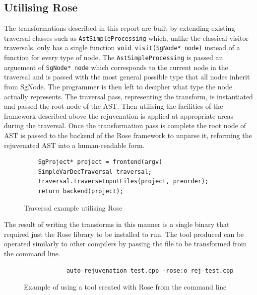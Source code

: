 \documentclass[bsc,frontabs,singlespacing,twoside,parskip,deptreport]{infthesis}
\begin{document}
\subsection{Utilising Rose} \label{UTIL_ROSE}

The transformations described in this report are built by extending existing traversal classes such as \texttt{AstSimpleProcessing} \cite{ROSE_MANUAL} which, unlike the classical visitor traversals, only has a single function \texttt{void visit(SgNode* node)} instead of a function for every type of node. The \texttt{AstSimpleProcessing} is passed an arguement of \texttt{SgNode* node} which corresponds to the current node in the traversal and is passed with the most general possible type that all nodes inherit from SgNode. The programmer is then left to decipher what type the node actually represents. The traversal pass, representing the transform, is instantiated and passed the root node of the AST. Then utilising the facilities of the framework described above the rejuvenation is applied at appropriate areas during the traversal. Once the transformation pass is complete the root node of AST is passed to the backend of the Rose framework to unparse it, reforming the rejuvenated AST into a human-readable form.    

\begin{figure}[!h]
    \centering
    \begin{verbatim}
    SgProject* project = frontend(argv)
    SimpleVarDecTraversal traversal;
    traversal.traverseInputFiles(project, preorder);
    return backend(project);
    \end{verbatim}
    \caption{Traversal example utilising Rose}
    \label{fig:trav-proj}
\end{figure}

The result of writing the transforms in this manner is a single binary that required just the Rose library to be installed to run. The tool produced can be operated similarly to other compilers by passing the file to be transformed from the command line.

\begin{figure}[!h]
    \centering
    \begin{verbatim}
            auto-rejuvenation test.cpp -rose:o rej-test.cpp
    \end{verbatim}
    \caption{Example of using a tool created with Rose from the command line}
    \label{fig:cmd-opt}
\end{figure}

    
\end{document}
